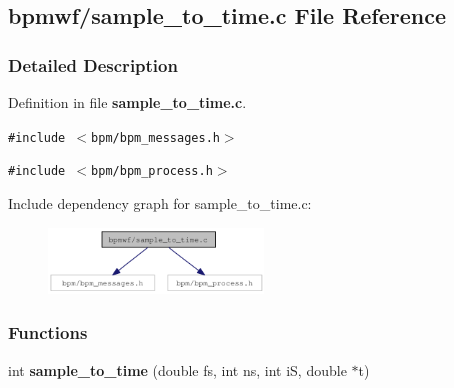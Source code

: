 \subsection{bpmwf/sample\_\-to\_\-time.c File Reference}
\label{sample__to__time_8c}


\subsubsection{Detailed Description}


Definition in file {\bf sample\_\-to\_\-time.c}.

{\tt \#include $<$bpm/bpm\_\-messages.h$>$}\par
{\tt \#include $<$bpm/bpm\_\-process.h$>$}\par


Include dependency graph for sample\_\-to\_\-time.c:\nopagebreak
\begin{figure}[H]
\begin{center}
\leavevmode
\includegraphics[width=162pt]{sample__to__time_8c__incl}
\end{center}
\end{figure}
\subsubsection*{Functions}
\begin{CompactItemize}
\item 
int \textbf{sample\_\-to\_\-time} (double fs, int ns, int iS, double $\ast$t)\label{group__wave_gc330e9905065c7209c22251d86a20ef7}

\end{CompactItemize}
